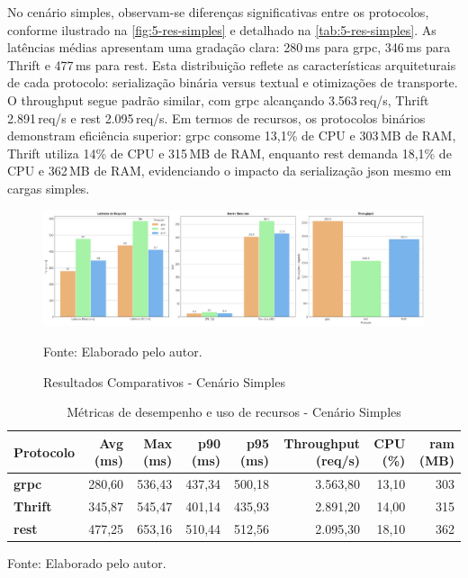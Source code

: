 No cenário simples, observam-se diferenças significativas entre os protocolos, conforme ilustrado na \autoref{fig:5-res-simples} e detalhado na \autoref{tab:5-res-simples}. As latências médias apresentam uma gradação clara: 280\,ms para \gls{grpc}, 346\,ms para Thrift e 477\,ms para \gls{rest}. Esta distribuição reflete as características arquiteturais de cada protocolo: serialização binária versus textual e otimizações de transporte. O throughput segue padrão similar, com \gls{grpc} alcançando 3.563\,req/s, Thrift 2.891\,req/s e \gls{rest} 2.095\,req/s. Em termos de recursos, os protocolos binários demonstram eficiência superior: \gls{grpc} consome 13,1\% de CPU e 303\,MB de RAM, Thrift utiliza 14\% de CPU e 315\,MB de RAM, enquanto \gls{rest} demanda 18,1\% de CPU e 362\,MB de RAM, evidenciando o impacto da serialização \acrshort{json} mesmo em cargas simples.


\begin{figure}[H]
\caption{Resultados Comparativos - Cenário Simples}
    \label{fig:5-res-simples}
    \centering
    \includegraphics[width=1\linewidth]{imagens/resultados/5-resultados-simples.png}    
    {\par \raggedright \footnotesize Fonte: Elaborado pelo autor.\par}
\end{figure}

\begin{table}[H]
\centering
\caption{Métricas de desempenho e uso de recursos - Cenário Simples}
\label{tab:5-res-simples}
\begin{tabular}[\linewidth]{lrrrrrrr}
\hline
Protocolo & Avg (ms) & Max (ms) & p90 (ms) & p95 (ms) & Throughput (req/s) & CPU (\%) & \acrshort{ram} (MB) \\
\hline
\textbf{\acrshort{grpc}} & 280,60 & 536,43 & 437,34 & 500,18 & 3.563,80 & 13,10 & 303 \\
\textbf{Thrift} & 345,87 & 545,47 & 401,14 & 435,93 & 2.891,20 & 14,00 & 315 \\
\textbf{\gls{rest}} & 477,25 & 653,16 & 510,44 & 512,56 & 2.095,30 & 18,10 & 362 \\
\hline
\end{tabular}
{\par \raggedright \footnotesize Fonte: Elaborado pelo autor.\par}
\end{table}

